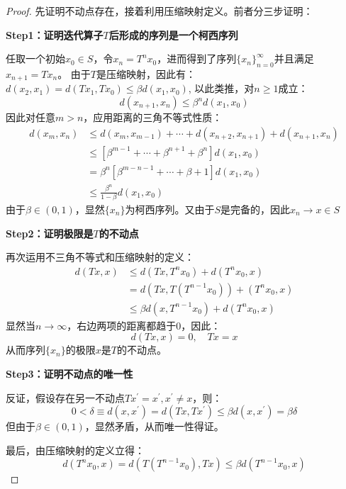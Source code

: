 \begin{proof}
    先证明不动点存在，接着利用压缩映射定义。前者分三步证明：

    \textbf{Step1：证明迭代算子$T$后形成的序列是一个柯西序列}

    任取一个初始$x_0 \in S$，令$x_n=T^n x_0$，进而得到了序列$\{x_n\}_{n=0}^{\infty}$并且满足$x_{n+1}=Tx_n$。
    由于$T$是压缩映射，因此有：$d\left(x_2, x_1\right)=d\left(T x_1, T x_0\right) \leq \beta d\left(x_1, x_0\right)$,
    以此类推，对$n\geq 1$成立：
    $$
    d\left(x_{n+1}, x_n\right) \leq \beta^n d\left(x_1, x_0\right)
    $$
    因此对任意$m>n$，应用距离的三角不等式性质：
    $$
    \begin{aligned}
    d\left(x_m, x_n\right) & \leq d\left(x_m, x_{m-1}\right)+\cdots+d\left(x_{n+2}, x_{n+1}\right)+d\left(x_{n+1}, x_n\right) \\
    & \leq\left[\beta^{m-1}+\cdots+\beta^{n+1}+\beta^n\right] d\left(x_1, x_0\right) \\
    & =\beta^n\left[\beta^{m-n-1}+\cdots+\beta+1\right] d\left(x_1, x_0\right) \\
    & \leq \frac{\beta^n}{1-\beta} d\left(x_1, x_0\right)
    \end{aligned}
    $$
    由于$\beta \in \left(0,1\right)$，显然$\{x_n\}$为柯西序列。又由于$S$是完备的，因此$x_n\rightarrow x \in S$

    \textbf{Step2：证明极限是$T$的不动点}

    再次运用不三角不等式和压缩映射的定义：
    $$
    \begin{aligned}
        d(T x, x) & \leq d\left(T x, T^n x_0\right)+d\left(T^n x_0, x\right) \\
        &= d\left(Tx,T\left(T^{n-1}x_0\right)\right) + \left(T^n x_0, x\right) \\
        & \leq \beta d\left(x, T^{n-1} x_0\right)+d\left(T^n x_0, x\right)
    \end{aligned}
    $$
    显然当$n\rightarrow \infty$，右边两项的距离都趋于0，因此：
    $$d\left(Tx,x\right)=0, \quad Tx = x$$
    从而序列$\{x_n\}$的极限$x$是$T$的不动点。

    \textbf{Step3：证明不动点的唯一性}

    反证，假设存在另一不动点$Tx^{\prime}=x^{\prime},x^{\prime} \neq x$，则：
    $$
    0<\delta \equiv d\left(x,x^{\prime}\right)=d\left(Tx,Tx^{\prime}\right)\leq \beta d\left(x,x^{\prime}\right)=\beta \delta
    $$
    但由于$\beta \in \left(0,1\right)$，显然矛盾，从而唯一性得证。

    最后，由压缩映射的定义立得：
    $$
    d\left(T^nx_0,x\right) = d\left(T\left(T^{n-1}x_0\right),Tx\right) \leq \beta d\left(T^{n-1}x_0,x\right)
    $$
\end{proof}

